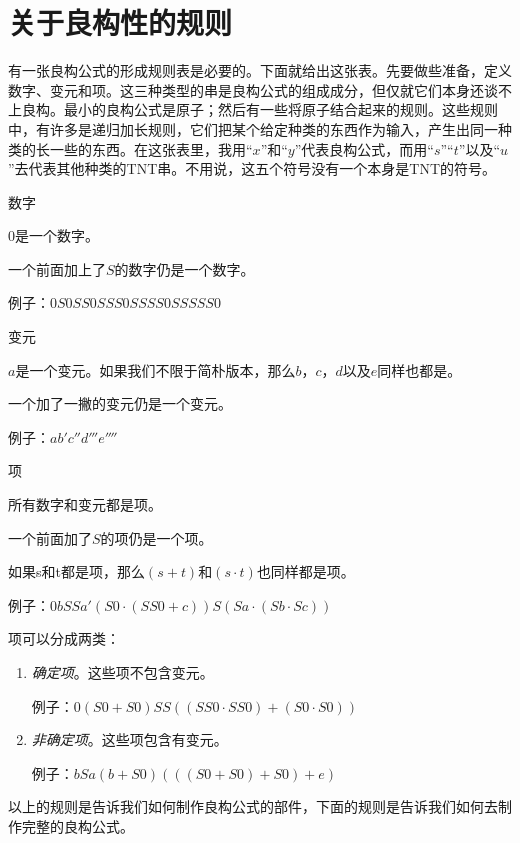 \section{关于良构性的规则}

有一张良构公式的形成规则表是必要的。下面就给出这张表。先要做些准备，定义数字、变元和项。这三种类型的串是良构公式的组成成分，但仅就它们本身还谈不上良构。最小的良构公式是原子；然后有一些将原子结合起来的规则。这些规则中，有许多是递归加长规则，它们把某个给定种类的东西作为输入，产生出同一种类的长一些的东西。在这张表里，我用“$x$”和“$y$”代表良构公式，而用“$s$”“$t$”以及“$u$”去代表其他种类的TNT串。不用说，这五个符号没有一个本身是TNT的符号。

\begin{rulelist}
\item[数字]\indent

$0$是一个数字。

一个前面加上了$S$的数字仍是一个数字。

例子：$0$\quad$S0$\quad$SS0$\quad$SSS0$\quad$SSSS0$\quad$SSSSS0$

\item[变元]\indent

$a$是一个变元。如果我们不限于简朴版本，那么$b$，$c$，$d$以及$e$同样也都是。

一个加了一撇的变元仍是一个变元。

例子：$a$\quad$b'$\quad$c''$\quad$d'''$\quad$e''''$

\item[项]\indent

所有数字和变元都是项。

一个前面加了$S$的项仍是一个项。

如果s和t都是项，那么$(s+t)$和$(s\cdot t)$也同样都是项。

例子：$0$\quad$b$\quad$SSa'$\quad$(S0\cdot(SS0+c))$\quad$S(Sa\cdot(Sb\cdot Sc))$

项可以分成两类：
\begin{enumerate}[labelindent=0pt]
\item \emph{确定项}。这些项不包含变元。

例子：$0$\quad$(S0+S0)$\quad$SS((SS0\cdot SS0)+(S0\cdot S0))$

\item \emph{非确定项}。这些项包含有变元。

例子：$b$\quad$Sa$\quad$(b+S0)$\quad$(((S0+S0)+S0)+e)$
\end{enumerate}
\end{rulelist}
以上的规则是告诉我们如何制作良构公式的部件，下面的规则是告诉我们如何去制作完整的良构公式。
